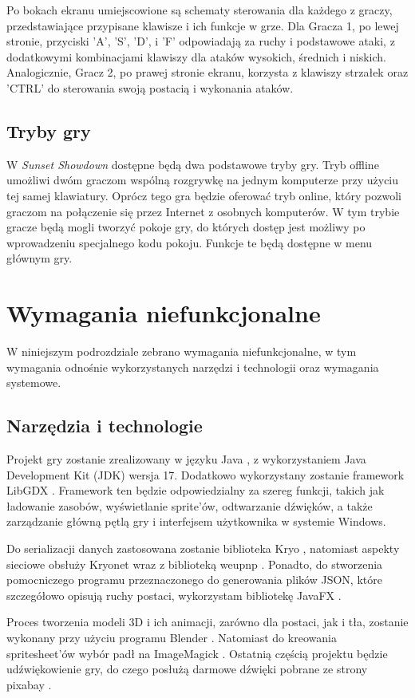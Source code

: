 Po bokach ekranu umiejscowione są schematy sterowania dla każdego z graczy, przedstawiające przypisane klawisze i ich funkcje w grze. Dla Gracza 1, po lewej stronie, przyciski 'A', 'S', 'D', i 'F' odpowiadają za ruchy i podstawowe ataki, z dodatkowymi kombinacjami klawiszy dla ataków wysokich, średnich i niskich. Analogicznie, Gracz 2, po prawej stronie ekranu, korzysta z klawiszy strzałek oraz 'CTRL' do sterowania swoją postacią i wykonania ataków.

\subsection{Tryby gry}
W \emph{Sunset Showdown} dostępne będą dwa podstawowe tryby gry. Tryb offline umożliwi dwóm graczom wspólną rozgrywkę na jednym komputerze przy użyciu tej samej klawiatury. Oprócz tego gra będzie oferować tryb online, który pozwoli graczom na połączenie się przez Internet z osobnych komputerów. W tym trybie gracze będą mogli tworzyć pokoje gry, do których dostęp jest możliwy po wprowadzeniu specjalnego kodu pokoju. Funkcje te będą dostępne w menu głównym gry.

\section{Wymagania niefunkcjonalne}
W niniejszym podrozdziale zebrano wymagania niefunkcjonalne, w tym wymagania odnośnie wykorzystanych narzędzi i technologii oraz wymagania systemowe.

\subsection{Narzędzia i technologie}
Projekt gry zostanie zrealizowany w języku Java \cite{Java}, z wykorzystaniem Java Development Kit (JDK) wersja 17.
Dodatkowo wykorzystany zostanie framework LibGDX \cite{LibGDX}. Framework ten będzie odpowiedzialny za szereg funkcji, takich jak ładowanie zasobów, wyświetlanie sprite'ów, odtwarzanie dźwięków, a także zarządzanie główną pętlą gry i interfejsem użytkownika w systemie Windows. 

Do serializacji danych zastosowana zostanie biblioteka Kryo \cite{Kryo}, natomiast aspekty sieciowe obsłuży Kryonet \cite{Kryonet} wraz z biblioteką weupnp \cite{weupnp}. Ponadto, do stworzenia pomocniczego programu przeznaczonego do generowania plików JSON, które szczegółowo opisują ruchy postaci, wykorzystam bibliotekę JavaFX \cite{JavaFX}. 

Proces tworzenia modeli 3D i ich animacji, zarówno dla postaci, jak i tła, zostanie wykonany przy użyciu programu Blender \cite{Blender}. Natomiast do kreowania spritesheet'ów wybór padł na ImageMagick \cite{ImageMagick}. Ostatnią częścią projektu będzie udźwiękowienie gry, do czego posłużą darmowe dźwięki pobrane ze strony pixabay \cite{Pixabay}. 


